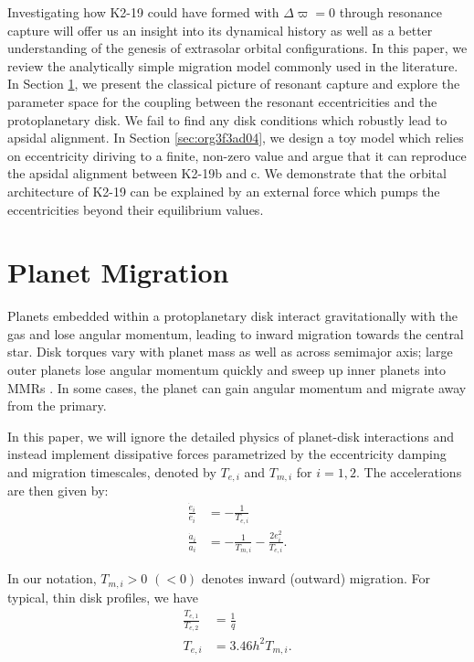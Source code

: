 \documentclass{mnras}
\begin{document}
Investigating how K2-19 could have formed with \(\Delta\varpi=0\)
through resonance capture will offer us an insight into its dynamical
history as well as a better understanding of the genesis of extrasolar
orbital configurations.  In this paper, we review the analytically
simple migration model commonly used in the literature.  In Section
\ref{sec:org82784c3}, we present the classical picture of resonant capture
and explore the parameter space for the coupling between the resonant
eccentricities and the protoplanetary disk. We fail to find any disk
conditions which robustly lead to apsidal alignment.  In Section
\ref{sec:org3f3ad04}, we design a toy model which relies on eccentricity
diriving to a finite, non-zero value and argue that it can reproduce
the apsidal alignment between K2-19b and c. We demonstrate that the
orbital architecture of K2-19 can be explained by an external force
which pumps the eccentricities beyond their equilibrium values.

\section{Planet Migration}
\label{sec:org82784c3}
Planets embedded within a protoplanetary disk interact gravitationally
with the gas and lose angular momentum, leading to inward migration
towards the central star.  Disk torques vary with planet mass as well
as across semimajor axis; large outer planets lose angular momentum
quickly and sweep up inner planets into MMRs
\cite{tanaka_three-dimensional_2004,xu_migration_2018}.  In some
cases, the planet can gain angular momentum and migrate away from the
primary.

In this paper, we will ignore the detailed physics of
planet-disk interactions and instead implement dissipative forces
parametrized by the eccentricity damping and migration timescales,
denoted by \(T_{e,i}\) and \(T_{m,i}\) for \(i=1,2\). The accelerations are
then given by:
\begin{align}\label{eq:disforce}
  \frac{\dot{e}_i}{e_i} &= -\frac{1}{T_{e,i}} \\
  \frac{\dot{a}_i}{a_i} &= -\frac{1}{T_{m,i}} -\frac{2e_i^2}{T_{e,i}}.
\end{align}

In our notation, \(T_{m,i}>0\) \((<0)\) denotes inward (outward)
migration.  For typical, thin disk profiles, we have
\cite{tanaka_three-dimensional_2004,cresswell_three-dimensional_2008,xu_migration_2018}
\begin{align}
  \frac{T_{e,1}}{T_{e,2}}&= \frac1q\\
  T_{e,i}&=3.46 h^2 T_{m,i}.
\end{align}
\end{document}

